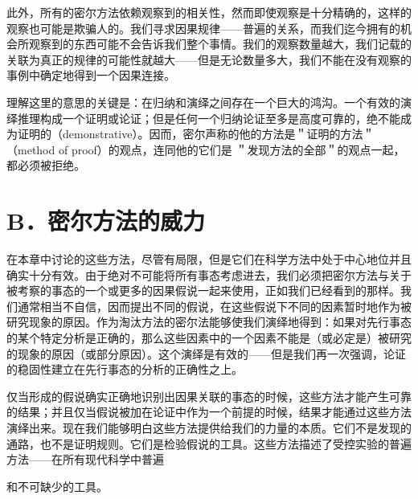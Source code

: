 此外，所有的密尔方法依赖观察到的相关性，然而即使观察是十分精确的，这样的观察也可能是欺骗人的。我们寻求因果规律——普遍的关系，而我们迄今拥有的机会所观察到的东西可能不会告诉我们整个事情。我们的观察数量越大，我们记载的关联为真正的规律的可能性就越大——但是无论数量多大，我们不能在没有观察的事例中确定地得到一个因果连接。

理解这里的意思的关键是：在归纳和演绎之间存在一个巨大的鸿沟。一个有效的演绎推理构成一个证明或论证；但是任何一个归纳论证至多是高度可靠的，绝不能成为证明的（demonstrative）。因而，密尔声称的他的方法是＂证明的方法＂（method of proof）的观点，连同他的它们是 ＂发现方法的全部＂的观点一起，都必须被拒绝。

\section*{B．密尔方法的威力}
在本章中讨论的这些方法，尽管有局限，但是它们在科学方法中处于中心地位并且确实十分有效。由于绝对不可能将所有事态考虑进去，我们必须把密尔方法与关于被考察的事态的一个或更多的因果假说一起来使用，正如我们已经看到的那样。我们通常相当不自信，因而提出不同的假说，在这些假说下不同的因素暂时地作为被研究现象的原因。作为淘汰方法的密尔法能够使我们演绎地得到：如果对先行事态的某个特定分析是正确的，那么这些因素中的一个因素不能是（或必定是）被研究的现象的原因（或部分原因）。这个演绎是有效的——但是我们再一次强调，论证的稳固性建立在先行事态的分析的正确性之上。

仅当形成的假说确实正确地识别出因果关联的事态的时候，这些方法才能产生可靠的结果；并且仅当假说被加在论证中作为一个前提的时候，结果才能通过这些方法演绎出来。现在我们能够明白这些方法提供给我们的力量的本质。它们不是发现的通路，也不是证明规则。它们是检验假说的工具。这些方法描述了受控实验的普遍方法——在所有现代科学中普遍

和不可缺少的工具。 